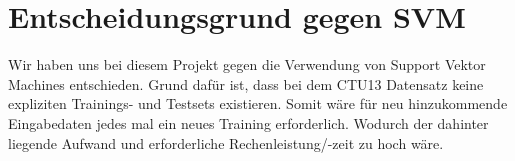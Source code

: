 \documentclass[a4paper,12pt]{article}
\begin{document}
\section{Entscheidungsgrund gegen SVM}
Wir haben uns bei diesem Projekt gegen die Verwendung von Support Vektor Machines entschieden. Grund dafür ist, dass bei dem CTU13 Datensatz keine expliziten Trainings- und Testsets existieren. Somit wäre für neu hinzukommende Eingabedaten jedes mal ein neues Training erforderlich. Wodurch der dahinter liegende Aufwand und erforderliche Rechenleistung/-zeit zu hoch wäre. 
\end{document}
